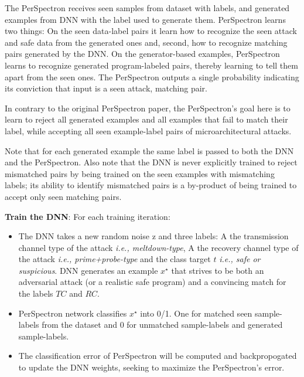  The PerSpectron receives seen samples from dataset  with labels, and generated examples from DNN with the label used to generate them.  PerSpectron learns two things: 
 On the seen data-label pairs it learn
 how to recognize the seen attack and safe data from the generated ones and, second, how to recognize matching pairs generated by the DNN. On the generator-based examples, PerSpectron learns to recognize generated program-labeled pairs, thereby learning to tell them apart from the seen ones. The PerSpectron outputs a single probability indicating its conviction that input is a seen attack, matching pair. 
 
\begin{note}
{In contrary to the original PerSpectron paper, the PerSpectron's goal here is to learn to reject all generated examples and all examples that fail to match their label, while accepting all seen example-label pairs of microarchitectural attacks.}
 \end{note}
 
 Note that for each generated example the same label is passed to both the DNN and the PerSpectron. Also note that the DNN is never explicitly trained to reject mismatched pairs by being trained on the seen examples with mismatching labels; its ability to identify mismatched pairs is a by-product of being trained to accept only seen matching pairs. 
 
 
\noindent\textbf{Train the DNN}:
For each training iteration:

\begin{itemize}  [topsep=0pt,parsep=0pt,partopsep=0pt, label={--}, leftmargin=*] %
\item  The DNN takes a new random noise z and three labels: A the transmission channel type of the attack {\em i.e., meltdown-type}, A the recovery channel type of the attack {\em i.e., prime+probe-type} and the class target $t$ {\em i.e., safe or suspicious}. DNN generates an example $x^{\star}$ that strives to be both an adversarial attack (or a realistic safe program) and a convincing match for the labels $TC$ and $RC$.  

\item PerSpectron network classifies $x^{\star}$ into 0/1. One for matched seen sample-labels from the dataset and 0 for unmatched sample-labels and generated sample-labels.    


\item  The classification error of PerSpectron will be computed and backpropogated to update the DNN weights, seeking to maximize the PerSpectron's error. 

\end{itemize}

